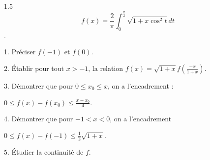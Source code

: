 \documentclass[12pt]{article}
\begin{document}
\begin{spacing}{1.5}
\[f(x)=\frac{2}{\pi}\int_{0}^{\frac{\pi}{2}}\sqrt{1+x\cos^2t}dt\].

1. Préciser $f(-1)$ et $f(0)$.

2. Établir pour tout $x>-1$, la relation $f(x)=\sqrt{1+x}f(\frac{-x}{1+x})$.

3. Démontrer que pour $0\leq x_0\leq x$, on a l'encadrement :

$0\leq f(x)-f(x_0)\leq \frac{x-x_0}{4}$.

4. Démontrer que pour $-1<x<0$, on a l'encadrement 

$0\leq f(x)-f(-1)\leq \frac{1}{2}\sqrt{1+x}$.

5. Étudier la continuité de $f$.



\medskip

\end{spacing}
\end{document}

